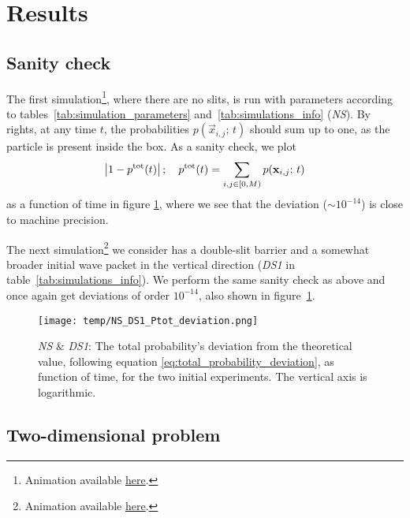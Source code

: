 \section{Results}\label{sec:results}





\subsection{Sanity check}\label{sec:results:sanity}

    The first simulation\footnote{Animation available \href{\animlink/NS_anim.mp4}{here}.}, where there are no slits, is run with parameters according to tables~\ref{tab:simulation_parameters} and~\ref{tab:simulations_info} (\textit{NS}). By rights, at any time $t$, the probabilities $p(\vec{x}_{i,j}; \, t)$ should sum up to one, as the particle is present inside the box. As a sanity check, we plot 
    \begin{equation}\label{eq:total_probability_deviation}
        \abs{1- p^\mathrm{tot}(t)}\,; \quad p^\mathrm{tot}(t) = \sum_{i,j\in [0, M)} p(\mathbf{x}_{i,j};\, t)
    \end{equation}
    as a function of time in figure \ref{fig:ptot_deviation_NS_DS1}, where we see that the deviation ($\sim 10^{-14}$) is close to machine precision.

    The next simulation\footnote{Animation available \href{\animlink/DS1_anim.mp4}{here}.} we consider has a double-slit barrier and a somewhat broader initial wave packet in the vertical direction (\textit{DS1} in table~\ref{tab:simulations_info}). We perform the same sanity check as above and once again get deviations of order $ 10^{-14}$, also shown in figure~\ref{fig:ptot_deviation_NS_DS1}.

    \begin{figure}[ht!]
        \centering
        \texttt{[image: temp/NS\_DS1\_Ptot\_deviation.png]}
        \caption{\textit{NS} \& \textit{DS1}: The total probability's deviation from the theoretical value, following equation \eqref{eq:total_probability_deviation}, as function of time, for the two initial experiments. The vertical axis is logarithmic.}
        \label{fig:ptot_deviation_NS_DS1}
    \end{figure}


\subsection{Two-dimensional problem}
    
